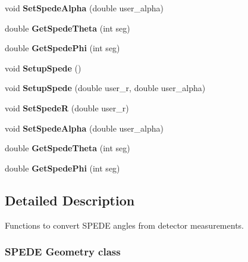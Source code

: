 \begin{DoxyCompactItemize}
void {\bfseries Set\+Spede\+Alpha} (double user\+\_\+alpha)
\item 
\mbox{\label{class_spede_geometry_a05865b0752fb518337a9a16f8fba9085}} 
double {\bfseries Get\+Spede\+Theta} (int seg)
\item 
\mbox{\label{class_spede_geometry_a93bd92636bce1259b189bb17275d238d}} 
double {\bfseries Get\+Spede\+Phi} (int seg)
\item 
\mbox{\label{class_spede_geometry_aff2cf68512c9a78eb117ff1ea44e95f0}} 
void {\bfseries Setup\+Spede} ()
\item 
\mbox{\label{class_spede_geometry_ae79185d5c0e1d21a1a26ef824038ce9c}} 
void {\bfseries Setup\+Spede} (double user\+\_\+r, double user\+\_\+alpha)
\item 
\mbox{\label{class_spede_geometry_ad17f4485ee83860a40082d8c8af5237c}} 
void {\bfseries Set\+SpedeR} (double user\+\_\+r)
\item 
\mbox{\label{class_spede_geometry_a94c3f5b2dbf4490db7d72514c8abe340}} 
void {\bfseries Set\+Spede\+Alpha} (double user\+\_\+alpha)
\item 
\mbox{\label{class_spede_geometry_a05865b0752fb518337a9a16f8fba9085}} 
double {\bfseries Get\+Spede\+Theta} (int seg)
\item 
\mbox{\label{class_spede_geometry_a93bd92636bce1259b189bb17275d238d}} 
double {\bfseries Get\+Spede\+Phi} (int seg)
\end{DoxyCompactItemize}


\subsection{Detailed Description}
Functions to convert S\+P\+E\+DE angles from detector measurements. 



 \subsubsection*{S\+P\+E\+DE Geometry class }


